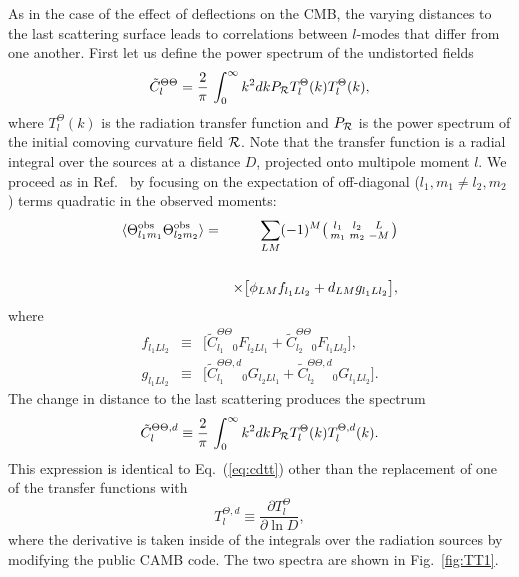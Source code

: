 \documentclass[prd,amsmath,amssymb,floatfix,superscriptaddress,nofootinbib,twocolumn]{revtex4-1}
\def\be{\begin{equation}}
\def\ee{\end{equation}}
\def\bea{\begin{eqnarray}}
\def\eea{\end{eqnarray}}
\newcommand{\vs}{\nonumber\\}
\newcommand{\ec}[1]{Eq.~(\ref{eq:#1})}
\newcommand{\eql}[1]{\label{eq:#1}}
\newcommand{\rf}[1]{\ref{fig:#1}}
\begin{document}
As in the case of the effect of deflections on the CMB, the varying distances to the last scattering surface leads to correlations between $l$-modes that differ from one another. 
First let us define the power spectrum of the undistorted fields
\begin{equation}
\tilde C_l^{\Theta\Theta} =  \frac{2}{\pi}\,\int_0^\infty k^2 dk P_{\cal R} T_l^ \Theta(k)T_l^ \Theta(k),
\eql{cdtt}
\end{equation}
where $T_l^\Theta(k)$ is the radiation transfer function and $P_{\cal R}$ is the  power spectrum of the initial comoving curvature field ${\cal R}$.  Note that the transfer function is a radial integral over
the sources at a distance $D$, projected onto multipole moment $l$.
We proceed as in Ref.~\cite{Hu:2001tn} by focusing on the expectation of off-diagonal (${l_1,m_1\ne l_2,m_2}$) terms quadratic in the observed moments:
\bea
\langle \tob_{l_1m_1} \tob_{l_2m_2} \rangle &=& \sum_{LM}  (-1)^M \bigl(\begin{smallmatrix} l_1 & l_2 & L \\ m_1 & m_2 & -M  \end{smallmatrix}\bigr) \nonumber \\
\vs&&\times\big[ \phi_{LM}f_{l_{1}Ll_{2}} + d_{LM}g_{l_{1}Ll_{2}} \big] ,  \eql{quad}
\eea
where
\bea
f_{l_1Ll_2} &\equiv& \big[ \tilde{C}_{l_{1}}^{\Theta\Theta} {}_{0}F_{l_{2}Ll_{1}} +\tilde{C}_{l_{2}}^{\Theta\Theta} {}_{0}F_{l_{1}Ll_{2}}\big],
\vs
g_{l_1Ll_2} &\equiv&\big[ \tilde{C}_{l_{1}}^{\Theta\Theta,d} {}_{0}G_{l_{2}Ll_{1}} +\tilde{C}_{l_{2}}^{\Theta \Theta,d} {}_{0}G_{l_{1}Ll_{2}}\big].\eql{lfg}
\eea
The change in distance to the last scattering  produces the spectrum
\be
\tilde{C}^{\Theta\Theta,d}_{l} \equiv \frac{2}{\pi}\,\int_0^\infty  k^2 dk P_{\cal R} T_l^\Theta(k) 
T_l^{\Theta,d}(k).
\eql{cld}
\ee
This expression is identical to \ec{cdtt} other than the replacement of one of the transfer functions with 
\begin{equation}
T_l^{\Theta,d} \equiv \frac{\partial T_l^\Theta}{\partial \ln D},
\end{equation}
where the derivative is taken inside of the integrals over the radiation sources by modifying
the public CAMB code. 
The two spectra are shown in Fig.~\rf{TT1}. 
\end{document}
